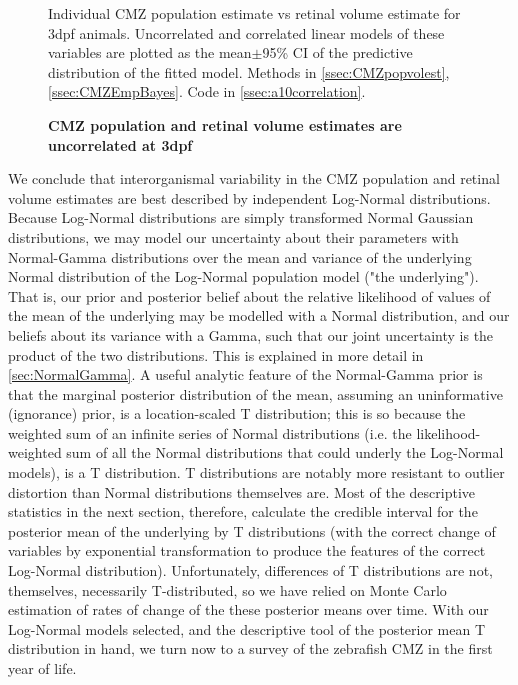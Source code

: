 \begin{figure}[!h]
    \caption{{\bf CMZ population and retinal volume estimates are uncorrelated at 3dpf}}
    Individual CMZ population estimate vs retinal volume estimate for 3dpf animals. Uncorrelated and correlated linear models of these variables are plotted as the mean$\pm$95\% CI of the predictive distribution of the fitted model. 
    Methods in \autoref{ssec:CMZpopvolest}, \autoref{ssec:CMZEmpBayes}.
    Code in \autoref{ssec:a10correlation}.
    \label{gausscorrelation}
\end{figure}

We conclude that interorganismal variability in the CMZ population and retinal volume estimates are best described by independent Log-Normal distributions. Because Log-Normal distributions are simply transformed Normal Gaussian distributions, we may model our uncertainty about their parameters with Normal-Gamma distributions over the mean and variance of the underlying Normal distribution of the Log-Normal population model ("the underlying"). That is, our prior and posterior belief about the relative likelihood of values of the mean of the underlying may be modelled with a Normal distribution, and our beliefs about its variance with a Gamma, such that our joint uncertainty is the product of the two distributions. This is explained in more detail in \autoref{sec:NormalGamma}. A useful analytic feature of the Normal-Gamma prior is that the marginal posterior distribution of the mean, assuming an uninformative (ignorance) prior, is a location-scaled T distribution; this is so because the weighted sum of an infinite series of Normal distributions (i.e. the likelihood-weighted sum of all the Normal distributions that could underly the Log-Normal models), is a T distribution. T distributions are notably more resistant to outlier distortion than Normal distributions themselves are. Most of the descriptive statistics in the next section, therefore, calculate the credible interval for the posterior mean of the underlying by T distributions (with the correct change of variables by exponential transformation to produce the features of the correct Log-Normal distribution). Unfortunately, differences of T distributions are not, themselves, necessarily T-distributed, so we have relied on Monte Carlo estimation of rates of change of the these posterior means over time. With our Log-Normal models selected, and the descriptive tool of the posterior mean T distribution in hand, we turn now to a survey of the zebrafish CMZ in the first year of life.

